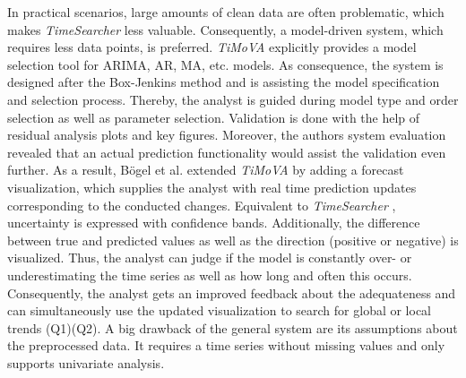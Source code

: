 \documentclass[electronic]{vgtc}             %
\begin{document}
In practical scenarios, large amounts of clean data are often problematic, which makes \textit{TimeSearcher} \cite{buono:2007} less valuable.
Consequently, a model-driven system, which requires less data points, is preferred.
\textit{TiMoVA} \cite{boegl:2013} explicitly provides a model selection tool for  ARIMA, AR, MA, etc. models.
As consequence, the system is designed after the Box-Jenkins method and is assisting the model specification and selection process.
Thereby, the analyst is guided during model type and order selection as well as parameter selection.
Validation is done with the help of residual analysis plots and key figures.
Moreover, the authors system evaluation revealed that an actual prediction functionality would assist the validation even further.
As a result, B\"ogel et al. \cite{boegl:2014} extended \textit{TiMoVA} by adding a forecast visualization, which supplies the analyst with real time prediction updates corresponding to the conducted changes.
Equivalent to \textit{TimeSearcher} \cite{buono:2007}, uncertainty is expressed with confidence bands. 
Additionally, the difference between true and predicted values as well as the direction (positive or negative) is visualized.
Thus, the analyst can judge if the model is constantly over- or underestimating the time series as well as how long and often this occurs.
Consequently, the analyst gets an improved feedback about the adequateness and can
simultaneously use the updated visualization to search for global or local trends (Q1)(Q2).
A big drawback of the general system are its assumptions about the preprocessed data. 
It requires a time series without missing values and only supports univariate analysis.
\end{document}
